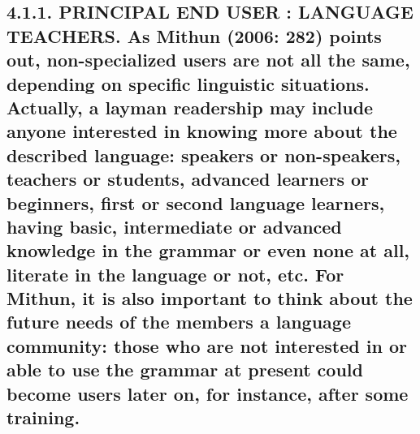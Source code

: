 \documentclass[letterpaper]{article}
\begin{document}
\subsection[4.1.1. PRINCIPAL END USER : LANGUAGE TEACHERS. As Mithun (2006: 282) points out, non{}-specialized users are not all the same, depending on specific linguistic situations. Actually, a layman readership may include anyone interested in knowing more about the described language: speakers or non{}-speakers, teachers or students, advanced learners or beginners, first or second language learners, having basic, intermediate or advanced knowledge in the grammar or even none at all, literate in the language or not, etc. For Mithun, it is also important to think about the future needs of the members a language community: those who are not interested in or able to use the grammar at present could become users later on, for instance, after some training. ]{4.1.1. PRINCIPAL END USER : LANGUAGE TEACHERS. \textmd{As Mithun (2006}\textmd{: }\textmd{282) point}\textmd{s}\textmd{ out, non-specialized users are not all the same, depend}\textmd{ing}\textmd{ on }\textmd{specific }\textmd{linguistic situation}\textmd{s}\textmd{. Actually, }\textmd{a }\textmd{layman }\textmd{readership }\textmd{may include anyone interested }\textmd{in}\textmd{ know}\textmd{ing}\textmd{ more about the described language: speakers or non-speakers, teachers or students, advanced}\textmd{ learners}\textmd{ or beginners, first or second language learners, }\textmd{having }\textmd{basic}\textmd{, intermediate or }\textmd{advanced }\textmd{knowledge in }\textmd{the }\textmd{grammar or }\textmd{even }\textmd{no}\textmd{ne at all}\textmd{, literate in the language or not, etc. For Mithun, it is also important to think about }\textmd{the }\textmd{future needs of}\textmd{ the members}\textmd{ a language community: those who are not interested}\textmd{ in}\textmd{ or able to use the grammar }\textmd{at present }\textmd{could become users later on, for instance}\textmd{,}\textmd{ after some training. }}
\end{document}
